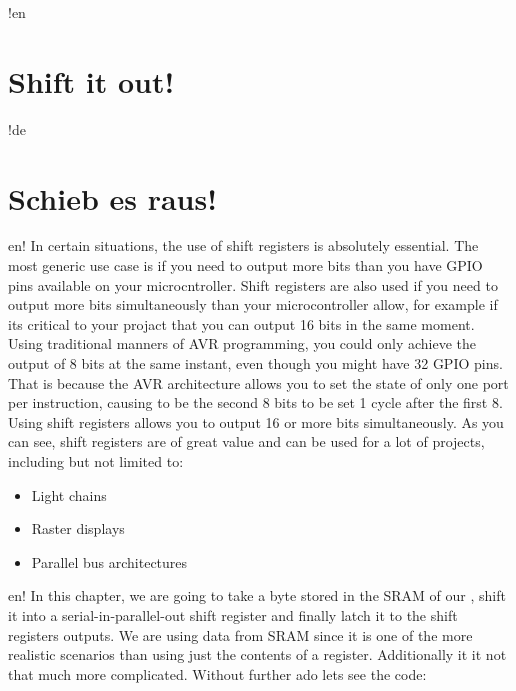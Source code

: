 !en \section{Shift it out!}
!de \section{Schieb es raus!}

en! In certain situations, the use of shift registers is absolutely essential. The most generic use case is if you need to output more bits than you have GPIO pins available on your microcntroller. Shift registers are also used if you need to output more bits simultaneously than your microcontroller allow, for example if its critical to your projact that you can output 16 bits in the same moment. Using traditional manners of AVR programming, you could only achieve the output of 8 bits at the same instant, even though you might have 32 GPIO pins. That is because the AVR architecture allows you to set the state of only one port per instruction, causing to be the second 8 bits to be set 1 cycle after the first 8. Using shift registers allows you to output 16 or more bits simultaneously. As you can see, shift registers are of great value and can be used for a lot of projects, including but not limited to:

\begin{itemize}
  \item {Light chains}
  \item {Raster displays}
  \item {Parallel bus architectures}
\end{itemize}

en! In this chapter, we are going to take a byte stored in the SRAM of our \at, shift it into a serial-in-parallel-out shift register and finally latch it to the shift registers outputs. We are using data from SRAM since it is one of the more realistic scenarios than using just the contents of a register. Additionally it it not that much more complicated. Without further ado lets see the code:

